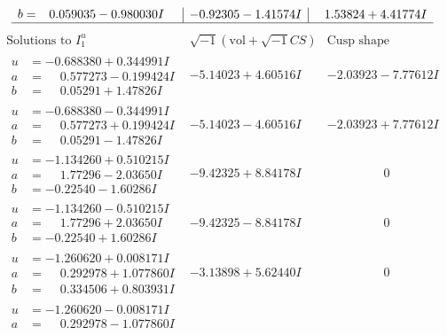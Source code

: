 \documentclass[1p]{elsarticle_modified}
\theoremstyle{definition}
\newcommand{\I}{\sqrt{-1}}
\begin{document}
$$\begin{array}{c|c|c}
\begin{aligned}
b &= \phantom{-}0.059035 - 0.980030 I\end{aligned}
 & -0.92305 - 1.41574 I & \phantom{-}1.53824 + 4.41774 I\\
 \hline 
 \end{array}$$\newpage$$\begin{array}{c|c|c}  
\text{Solutions to }I^u_{1}& \I (\text{vol} + \sqrt{-1}CS) & \text{Cusp shape}\\
 \hline 
\begin{aligned}
u &= -0.688380 + 0.344991 I \\
a &= \phantom{-}0.577273 - 0.199424 I \\
b &= \phantom{-}0.05291 + 1.47826 I\end{aligned}
 & -5.14023 + 4.60516 I & -2.03923 - 7.77612 I \\ \hline\begin{aligned}
u &= -0.688380 - 0.344991 I \\
a &= \phantom{-}0.577273 + 0.199424 I \\
b &= \phantom{-}0.05291 - 1.47826 I\end{aligned}
 & -5.14023 - 4.60516 I & -2.03923 + 7.77612 I \\ \hline\begin{aligned}
u &= -1.134260 + 0.510215 I \\
a &= \phantom{-}1.77296 - 2.03650 I \\
b &= -0.22540 - 1.60286 I\end{aligned}
 & -9.42325 + 8.84178 I & \phantom{-0.000000 } 0 \\ \hline\begin{aligned}
u &= -1.134260 - 0.510215 I \\
a &= \phantom{-}1.77296 + 2.03650 I \\
b &= -0.22540 + 1.60286 I\end{aligned}
 & -9.42325 - 8.84178 I & \phantom{-0.000000 } 0 \\ \hline\begin{aligned}
u &= -1.260620 + 0.008171 I \\
a &= \phantom{-}0.292978 + 1.077860 I \\
b &= \phantom{-}0.334506 + 0.803931 I\end{aligned}
 & -3.13898 + 5.62440 I & \phantom{-0.000000 } 0 \\ \hline\begin{aligned}
u &= -1.260620 - 0.008171 I \\
a &= \phantom{-}0.292978 - 1.077860 I \\

\end{aligned}
\end{array}$$
\end{document}
